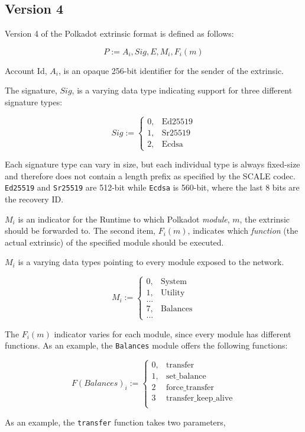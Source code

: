 \subsection{Version 4}

Version 4 of the Polkadot extrinsic format is defined as follows:

\[
    P := A_i, Sig, E, M_i, F_i(m)
\]

\begin{definition}
    Account Id, $A_i$, is an opaque 256-bit identifier for the sender of the
    extrinsic.
\end{definition}

\begin{definition}
    The signature, $Sig$, is a varying data type indicating support for three
    different signature types:

    \[
        Sig :=
        \begin{cases}
        0, & \text{Ed25519} \\
        1, & \text{Sr25519} \\
        2, & \text{Ecdsa}
        \end{cases}
    \]

    Each signature type can vary in size, but each individual type is always
    fixed-size and therefore does not contain a length prefix as specified by
    the SCALE codec. \verb|Ed25519| and \verb|Sr25519| are 512-bit while
    \verb|Ecdsa| is 560-bit, where the last 8 bits are the recovery ID.
\end{definition}

$M_i$ is an indicator for the Runtime to which Polkadot \textit{module}, $m$,
the extrinsic should be forwarded to. The second item, $F_i(m)$, indicates
which \textit{function} (the actual extrinsic) of the specified module should
be executed.
\newline

$M_i$ is a varying data types pointing to every module exposed to the network.

\[
M_i :=
\begin{cases}
0, & \text{System} \\
1, & \text{Utility} \\
... & \\
7, & \text{Balances} \\
... &
\end{cases}
\]

The $F_i(m)$ indicator varies for each module, since every module has different
functions. As an example, the \verb|Balances| module offers the following
functions:

\[
F(Balances)_i :=
\begin{cases}
0, & \text{transfer} \\
1, & \text{set\_balance} \\
2 & \text{force\_transfer} \\
3 & \text{transfer\_keep\_alive} \\
\end{cases}
\]

As an example, the \verb|transfer| function takes two parameters, 
